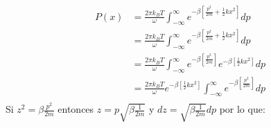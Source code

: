 \documentclass[a4paper]{article}
\begin{document}
    \begin{answer}
        \begin{align*}
            P(x) &= \frac{2 \pi k_B T}{\omega} \int_{-\infty}^{\infty} e^{-\beta\left[\frac{p^2}{2 m}+\frac{1}{2} k x^2\right]} d p \\
            &= \frac{2 \pi k_B T}{\omega} \int_{-\infty}^{\infty} e^{-\beta\left[\frac{p^2}{2 m}+\frac{1}{2} k x^2\right]} d p \\
            &= \frac{2 \pi k_B T}{\omega} \int_{-\infty}^{\infty} e^{-\beta\left[\frac{p^2}{2 m}\right]} e^{-\beta\left[\frac{1}{2} k x^2\right]} d p \\
            &= \frac{2 \pi k_B T}{\omega} e^{-\beta\left[\frac{1}{2} k x^2\right]} \int_{-\infty}^{\infty} e^{-\beta\left[\frac{p^2}{2 m}\right]} d p \\
        \end{align*}
        Si $z^2 = \beta \frac{p^2}{2m}$ entonces $z= p\sqrt{\beta \frac{1}{2m}}$ y $d z = \sqrt{\beta \frac{1}{2m}} d p$ por lo que:


\end{answer}
\end{document}
